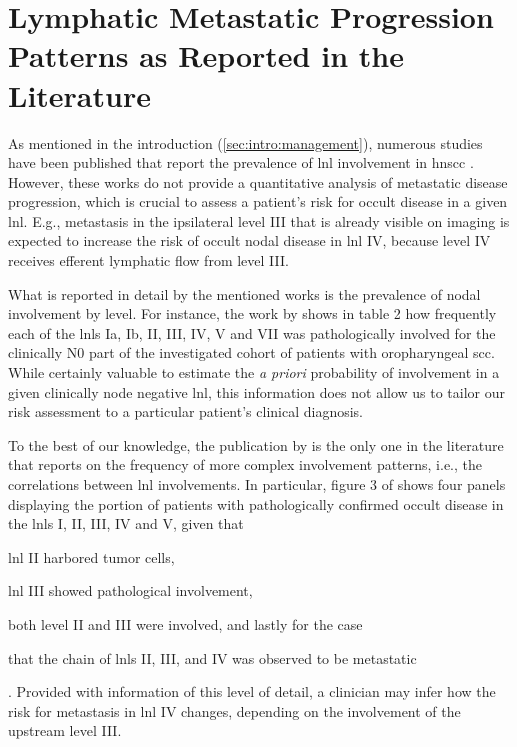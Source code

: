 \documentclass[\relativeRoot/main.tex]{subfiles}
\begin{document}
\section{Lymphatic Metastatic Progression Patterns as Reported in the Literature}
\label{sec:previous_work:sanguineti}

As mentioned in the introduction (\cref{sec:intro:management}), numerous studies have been published that report the prevalence of \gls{lnl} involvement in \gls{hnscc} \cite{candela_patterns_1990,shah_patterns_1990,woolgar_histological_1999,woolgar_topography_2007,chao_determination_2002,vauterin_patterns_2006,razfar_incidence_2009,ho_patterns_2012,bauwens_prevalence_2021}. However, these works do not provide a quantitative analysis of metastatic disease progression, which is crucial to assess a patient's risk for occult disease in a given \gls{lnl}. E.g., metastasis in the ipsilateral level III that is already visible on imaging is expected to increase the risk of occult nodal disease in \gls{lnl} IV, because level IV receives efferent lymphatic flow from level III.

What is reported in detail by the mentioned works is the prevalence of nodal involvement by level. For instance, the work by  shows in table 2 how frequently each of the \glspl{lnl} Ia, Ib, II, III, IV, V and VII was pathologically involved for the clinically N0 part of the investigated cohort of patients with oropharyngeal \gls{scc}. While certainly valuable to estimate the \emph{a priori} probability of involvement in a given clinically node negative \gls{lnl}, this information does not allow us to tailor our risk assessment to a particular patient's clinical diagnosis.

To the best of our knowledge, the publication by  is the only one in the literature that reports on the frequency of more complex involvement patterns, i.e., the correlations between \gls{lnl} involvements. In particular, figure 3 of  shows four panels displaying the portion of patients with pathologically confirmed occult disease in the \glspl{lnl} I, II, III, IV and V, given that
\begin{enumerate*}[label={(\alph*)}]
    \item \gls{lnl} II harbored tumor cells,
    \item \gls{lnl} III showed pathological involvement,
    \item both level II and III were involved, and lastly for the case
    \item that the chain of \glspl{lnl} II, III, and IV was observed to be metastatic
\end{enumerate*}. Provided with information of this level of detail, a clinician may infer how the risk for metastasis in \gls{lnl} IV changes, depending on the involvement of the upstream level III.
\end{document}
